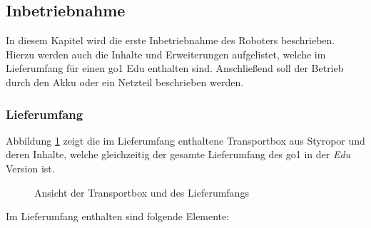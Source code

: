 \subsection{Inbetriebnahme}
\label{subsec:inbetriebnahme}

In diesem Kapitel wird die erste Inbetriebnahme des Roboters beschrieben.
Hierzu werden auch die Inhalte und Erweiterungen aufgelistet, welche im Lieferumfang für einen \gls{go1} Edu enthalten sind.
Anschließend soll der Betrieb durch den Akku oder ein Netzteil beschrieben werden.


\subsubsection{Lieferumfang}

Abbildung \ref{fig:lieferumfang} zeigt die im Lieferumfang enthaltene Transportbox aus Styropor und deren Inhalte, welche
gleichzeitig der gesamte Lieferumfang des \gls{go1} in der \emph{Edu} Version ist.

\begin{figure}[h]
    \caption{Ansicht der Transportbox und des Lieferumfangs}\label{fig:lieferumfang}
\end{figure}

\noindent Im Lieferumfang enthalten sind folgende Elemente:

